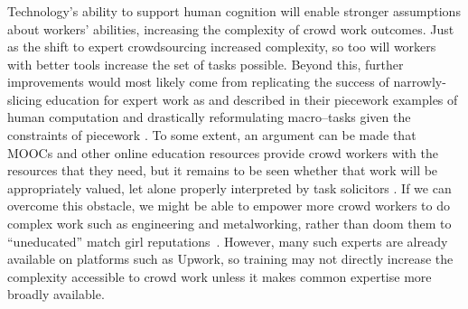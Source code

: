 \documentclass[trackingWork]{subfiles}
\begin{document}
\subsubsection{\implication}
Technology's ability to support human cognition will enable stronger assumptions about workers' abilities, increasing the complexity of crowd work outcomes.
Just as the shift to expert crowdsourcing increased complexity, so too will workers with better tools increase the set of tasks possible.
Beyond this, further improvements would most likely come from replicating the success of narrowly-slicing education for expert work as \citeauthor{hart2013rise} and \citeauthor{grier2013computers} described in their piecework examples
of human computation \cite{grier2013computers} and drastically reformulating macro--tasks given the constraints of piecework \cite{hart2013rise}.
To some extent, an argument can be made that
MOOCs and other online education resources
provide crowd workers with the resources that they need, but 
it remains to be seen whether that work will be appropriately valued, let alone
properly interpreted by task solicitors
\cite{aguaded2013mooc}.
If we can overcome this obstacle,
we might be able to empower more crowd workers to do complex work such as engineering and metalworking,
rather than doom them to ``uneducated'' match girl reputations~\cite{10.2307/3827491}.
However, many such experts are already available on platforms such as Upwork, so training may not directly increase the complexity accessible to crowd work unless it makes common expertise more broadly available.
\end{document}

